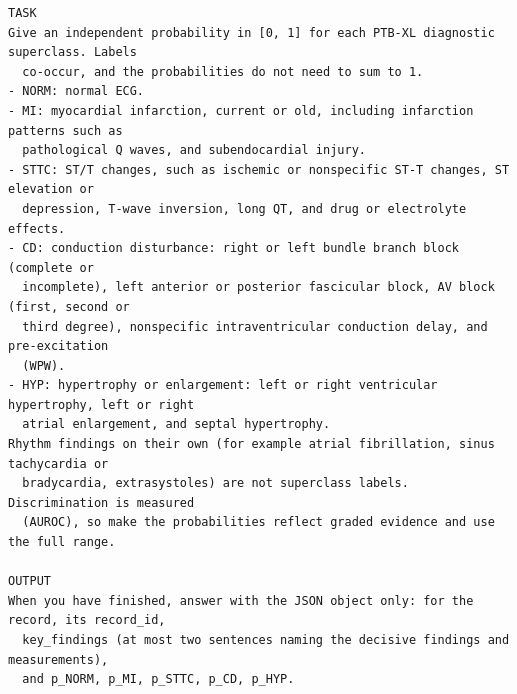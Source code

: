 \begin{small}
\begin{verbatim}
TASK
Give an independent probability in [0, 1] for each PTB-XL diagnostic superclass. Labels 
  co-occur, and the probabilities do not need to sum to 1.
- NORM: normal ECG.
- MI: myocardial infarction, current or old, including infarction patterns such as 
  pathological Q waves, and subendocardial injury.
- STTC: ST/T changes, such as ischemic or nonspecific ST-T changes, ST elevation or 
  depression, T-wave inversion, long QT, and drug or electrolyte effects.
- CD: conduction disturbance: right or left bundle branch block (complete or 
  incomplete), left anterior or posterior fascicular block, AV block (first, second or 
  third degree), nonspecific intraventricular conduction delay, and pre-excitation 
  (WPW).
- HYP: hypertrophy or enlargement: left or right ventricular hypertrophy, left or right 
  atrial enlargement, and septal hypertrophy.
Rhythm findings on their own (for example atrial fibrillation, sinus tachycardia or 
  bradycardia, extrasystoles) are not superclass labels. Discrimination is measured 
  (AUROC), so make the probabilities reflect graded evidence and use the full range.

OUTPUT
When you have finished, answer with the JSON object only: for the record, its record_id, 
  key_findings (at most two sentences naming the decisive findings and measurements), 
  and p_NORM, p_MI, p_STTC, p_CD, p_HYP.
\end{verbatim}
\end{small}
